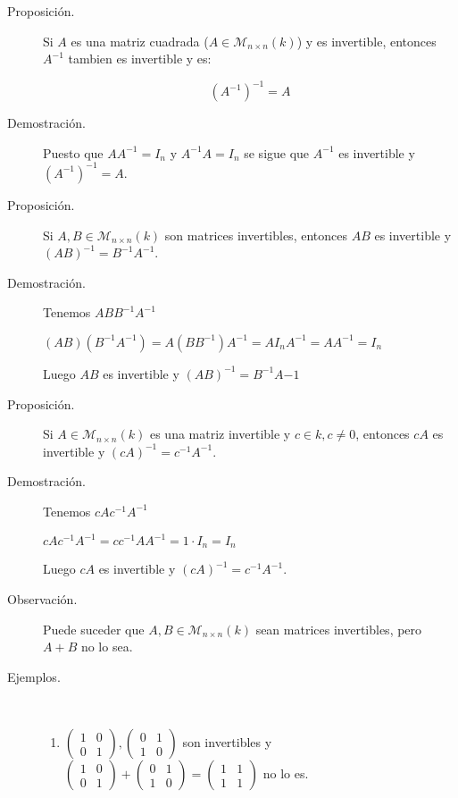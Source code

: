 \documentclass[12pt]{article}
\begin{document}
\begin{description}
\item [Proposición.] Si $A$ es una matriz cuadrada ($A \in \mathcal{M}_{n \times n}(k)$) y es invertible, entonces $A^{-1}$ tambien es invertible y es:

\begin{equation}
(A^{-1})^{-1} = A
\end{equation}

\item [Demostración.] Puesto que $A A^{-1} = I_n$ y $A^{-1} A = I_n$ se sigue que $A^{-1}$ es invertible y $(A^{-1})^{-1} = A$.

\item [Proposición.] Si $A, B \in \mathcal{M}_{n \times n}(k)$ son matrices invertibles, entonces $A B$ es invertible y $(A B)^{-1} = B^{-1} A^{-1}$.

\item [Demostración.] Tenemos $A B B^{-1} A^{-1}$

\begin{math}
(A B)(B^{-1} A^{-1}) = A (B B^{-1}) A^{-1} = A I_n A^{-1} = A A^{-1} = I_n
\end{math}

Luego $A B$ es invertible y $(A B)^{-1} = B^{-1} A{-1}$

\item [Proposición.] Si $A \in \mathcal{M}_{n \times n}(k)$ es una matriz invertible y $c \in k, c \ne 0$, entonces $c A$ es invertible y $(c A)^{-1} = c^{-1} A^{-1}$.

\item [Demostración.] Tenemos $c A c^{-1} A^{-1}$

\begin{math}
c A c^{-1} A^{-1} = c c^{-1} A A^{-1} = 1 \cdot I_n = I_n
\end{math}

Luego $c A$ es invertible y $(c A)^{-1} = c^{-1} A^{-1}$.

\item [Observación.] Puede suceder que $A, B \in \mathcal{M}_{n \times n}(k)$ sean matrices invertibles, pero $A + B$ no lo sea.

\item [Ejemplos.] \mbox{}\\

\begin{enumerate}
\item $
\begin{pmatrix}
1 & 0 \\
0 & 1
\end{pmatrix},
\begin{pmatrix}
0 & 1 \\
1 & 0
\end{pmatrix}
$ son invertibles y $
\begin{pmatrix}
1 & 0 \\
0 & 1
\end{pmatrix}+
\begin{pmatrix}
0 & 1 \\
1 & 0
\end{pmatrix}=
\begin{pmatrix}
1 & 1 \\
1 & 1
\end{pmatrix}
$ no lo es.


\end{enumerate}
\end{description}
\end{document}
